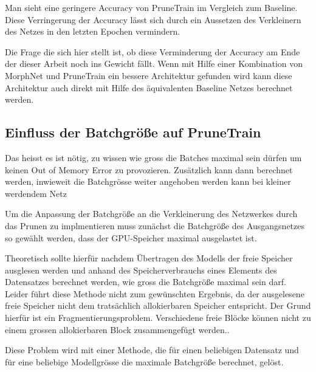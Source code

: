 Man sieht eine geringere Accuracy von PruneTrain im Vergleich zum Baseline. Diese Verringerung der Accuracy lässt sich durch ein Aussetzen des Verkleinern des Netzes in den letzten Epochen  
vermindern.

Die Frage die sich hier stellt ist, ob diese Verminderung der Accuracy am Ende der dieser Arbeit noch ins Gewicht fällt. Wenn mit Hilfe einer Kombination von MorphNet und PruneTrain ein bessere Architektur gefunden wird kann diese Architektur auch direkt mit Hilfe des äquivalenten Baseline Netzes berechnet werden.

\subsection{Einfluss der Batchgröße auf PruneTrain}\label{sec:batch}

Das heisst es ist nötig, zu wissen wie gross die Batches maximal sein dürfen um keinen Out of Memory Error zu provozieren. Zusätzlich kann dann berechnet werden, inwieweit die Batchgrösse weiter angehoben werden kann bei kleiner werdendem Netz

Um die Anpassung der Batchgröße an die Verkleinerung des Netzwerkes durch das Prunen zu implmentieren muss zunächst die Batchgröße des Ausgangsnetzes so gewählt werden, dass der GPU-Speicher maximal ausgelastet ist.



Theoretisch sollte hierfür nachdem Übertragen des Modells der freie Speicher ausglesen werden und anhand des Speicherverbrauchs eines Elements des Datensatzes berechnet werden, wie gross die Batchgröße maximal sein darf. Leider führt diese Methode nicht zum gewünschten Ergebnis, da der ausgelesene freie Speicher nicht dem tratsächlich allokierbaren Speicher entspricht.
Der Grund hierfür ist ein Fragmentierungsproblem. Verschiedene freie Blöcke können nicht zu einem grossen allokierbaren Block zusammengefügt werden.. 

Diese Problem wird mit einer Methode, die für einen beliebigen Datensatz und für eine beliebige Modellgrösse die maximale Batchgröße berechnet, gelöst. 


